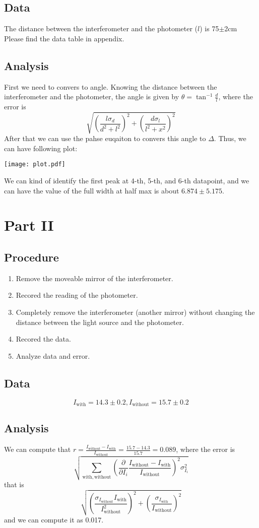 \documentclass[aps,prl,reprint]{revtex4-1}
\begin{document}
\subsection{Data}
The distance between the interferometer and the photometer ($l$) is 75$\pm$2cm
Please find the data table in appendix.
\subsection{Analysis}
First we need to convers to angle. Knowing the distance between the interferometer and the photometer, the angle is given by $\theta = \tan^{-1} \frac{d}{l}$, where the error is 
\[
\sqrt{(\frac{l \sigma_d}{d^2+l^2})^2 + (\frac{d\sigma_l}{l^2+x^2})^2}
\]
After that we can use the pahse euqaiton to convers this angle to $\Delta$. Thus, we can have following plot:
\begin{center}
 \texttt{[image: plot.pdf]}
\end{center}
We can kind of identify the first peak at 4-th, 5-th, and 6-th datapoint, and we can have the value of the full width at half max is about $6.874\pm5.175$.

\section{Part II}
\subsection{Procedure}
\begin{enumerate}
    \item Remove the moveable mirror of the interferometer.
    \item Recored the reading of the photometer.
    \item Completely remove the interferometer (another mirror) without changing the distance between the light source and the photometer.
    \item Recored the data.
    \item Analyze data and error.
\end{enumerate}
\subsection{Data}
\[
I_{\mathrm{with}} = 14.3 \pm 0.2, I_\mathrm{without} = 15.7 \pm 0.2
\]
\subsection{Analysis}
We can compute that $r = \frac{I_\mathrm{without} - I_{\mathrm{with}}}{I_\mathrm{without}} = \frac{15.7 - 14.3}{15.7} = 0.089$, where the error is 
\[
\sqrt{\sum_{\mathrm{with, without}}(\frac{\partial}{\partial I_i} \frac{I_\mathrm{without} - I_{\mathrm{with}}}{I_\mathrm{without}})^2\sigma_{I_i}^2} 
\]
that is
\[
\sqrt{ \left(\frac{\sigma_{I_\mathrm{without}} I_\mathrm{with}}{I_\mathrm{without}^2}\right)^2 + \left(\frac{\sigma_{I_\mathrm{with}} }{I_\mathrm{without}}\right)^2}
\]
and we can compute it as 0.017.
\end{document}

